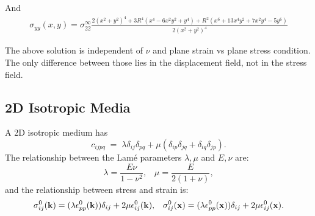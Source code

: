 \documentclass[12pt]{article}
\begin{document}
And 
\begin{eqnarray}
 \sigma_{yy}(x,y) = \sigma_{22}^\infty 
\frac{2(x^2+y^2)^4 + 3R^4(x^4-6x^2y^2+y^4)+R^2(x^6+13x^4y^2+7x^2y^4-5y^6)}{2(x^2+y^2)^4}
\end{eqnarray}

\begin{figure}[th]
\begin{center}
\end{center}
\caption{}
\label{CylindricalVoid}
\end{figure}

The above solution is independent of $\nu$ and plane strain vs plane
stress condition.  The only difference between those lies in the
displacement field, not in the stress field.



\subsection{2D Isotropic Media}
\label{sec:2DIsotropicMedia}

A 2D isotropic medium has 
\begin{equation}
 c_{ijpq} \;=\; \lambda \delta_{ij}\delta_{pq} + 
\mu(\delta_{ip}\delta_{jq}+\delta_{iq}\delta_{jp}).
\end{equation}
The relationship between the Lam\'{e} parameters $\lambda,\mu$ and $E,\nu$ are:
\begin{equation}
 \lambda = \frac{E\nu}{1-\nu^2}, \;\;\;
 \mu = \frac{E}{2(1+\nu)},
\end{equation}
and the relationship between stress and strain is:
\begin{equation}
 \sigma^0_{ij}({\bf k}) = (\lambda\epsilon^0_{pp}({\bf k}))\delta_{ij} 
                            + 2\mu\epsilon^0_{ij}({\bf k}), \;\;\;
 \sigma^0_{ij}({\bf x}) = (\lambda\epsilon^0_{pp}({\bf x}))\delta_{ij} 
                            + 2\mu\epsilon^0_{ij}({\bf x}).
\end{equation}
\end{document}
